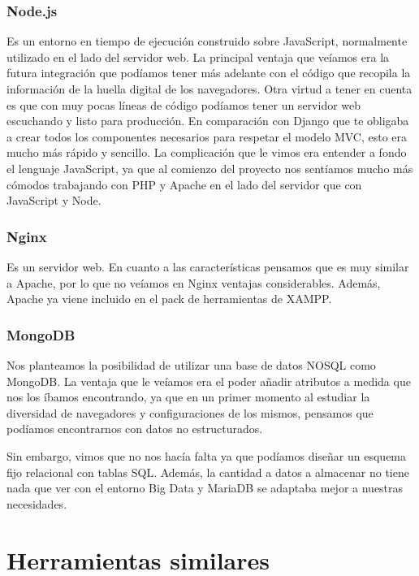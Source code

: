 \subsubsection{Node.js}
Es un entorno en tiempo de ejecución construido sobre JavaScript, normalmente utilizado en el lado del servidor web. La principal ventaja que veíamos era la futura integración que podíamos tener más adelante con el código que recopila la información de la huella digital de los navegadores. Otra virtud a tener en cuenta es que con muy pocas líneas de código podíamos tener un servidor web escuchando y listo para producción. En comparación con Django que te obligaba a crear todos los componentes necesarios para respetar el modelo MVC, esto era mucho más rápido y sencillo. La complicación que le vimos era entender a fondo el lenguaje JavaScript, ya que al comienzo del proyecto nos sentíamos mucho más cómodos trabajando con PHP y Apache en el lado del servidor que con JavaScript y Node. \par 

\subsubsection{Nginx}
Es un servidor web. En cuanto a las características pensamos que es muy similar a Apache, por lo que no veíamos en Nginx ventajas considerables. Además, Apache ya viene incluido en el pack de herramientas de XAMPP. \par 

\subsubsection{MongoDB}
Nos planteamos la posibilidad de utilizar una base de datos NOSQL como MongoDB. La ventaja que le veíamos era el poder añadir atributos a medida que nos los íbamos encontrando, ya que en un primer momento al estudiar la diversidad de navegadores y configuraciones de los mismos, pensamos que podíamos encontrarnos con datos no estructurados. \par 

Sin embargo, vimos que no nos hacía falta ya que podíamos diseñar un esquema fijo relacional con tablas SQL. Además, la cantidad a datos a almacenar no tiene nada que ver con el entorno Big Data y MariaDB se adaptaba mejor a nuestras necesidades. \par 

\section{Herramientas similares}

